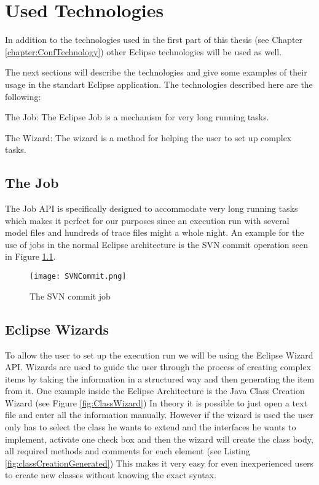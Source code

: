 \chapter{Used Technologies}
\label{chapter:AutoTechnologies}

In addition to the technologies used in the first part of this
thesis (see Chapter \ref{chapter:ConfTechnology}) other Eclipse
technologies will be used as well.

The next sections will describe the technologies and give some
examples of their usage in the standart Eclipse application.
The technologies described here are the following:
\begin{description}
 \item The Job: The Eclipse Job is a mechanism for very long running tasks.
 \item The Wizard: The wizard is a method for helping the user to set up complex tasks.
\end{description}


\section{The Job}
\label{section:AutoTechJob}

The Job API is specifically designed to accommodate very long running
tasks which makes it perfect for our purposes since an execution
run with several model files and hundreds of trace files might
a whole night.
An example for the use of jobs in the normal Eclipse architecture
is the SVN commit operation seen in Figure \ref{fig:SVNCommit}.

\begin{figure}[SVNCommit]
  \centering
  \texttt{[image: SVNCommit.png]}
  \caption[The SVN commit job]%
  {The SVN commit job\protect}
  \label{fig:SVNCommit}
\end{figure}



\section{Eclipse Wizards}
\label{section:AutoTechWizards}
To allow the user to set up the execution run we will be using the
Eclipse Wizard API.
Wizards are used to guide the user through the process of creating complex items by taking
the information in a structured way and then generating the item from it.
One example inside the Eclipse Architecture is the Java Class Creation Wizard (see Figure \ref{fig:ClassWizard})
In theory it is possible to just open a text file and enter all the information manually.
However if the wizard is used the user only has to select the class he wants to extend
and the interfaces he wants to implement, activate one check box and then the wizard will
create the class body, all required methods and comments for each element (see Listing \ref{fig:classCreationGenerated})
This makes it very easy for even inexperienced users to create new classes without knowing
the exact syntax.


